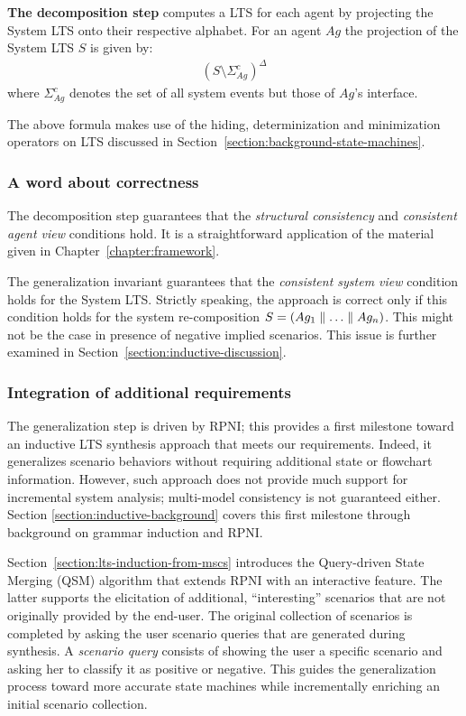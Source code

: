\noindent \textbf{The decomposition step} computes a LTS for each agent by projecting the System LTS onto their respective alphabet. For an agent $Ag$ the projection of the System LTS $S$ is given by:
\begin{align}
(S \setminus \Sigma_{Ag}^c)^\Delta
\end{align}
\noindent where $\Sigma_{Ag}^c$ denotes the set of all system events but those of $Ag$'s interface.

The above formula makes use of the hiding, determinization and minimization operators on LTS discussed in Section~\ref{section:background-state-machines}.

\subsubsection*{A word about correctness}

The decomposition step guarantees that the \emph{structural consistency} and \emph{consistent agent view} conditions hold. It is a straightforward application of the material given in Chapter~\ref{chapter:framework}. 

The generalization invariant guarantees that the \emph{consistent system view} condition holds for the System LTS. Strictly speaking, the approach is correct only if this condition holds for the system re-composition $S = (Ag_1 \parallel \ldots \parallel Ag_n)$. This might not be the case in presence of negative implied scenarios. This issue is further examined in Section~\ref{section:inductive-discussion}.

\subsubsection*{Integration of additional requirements}

The generalization step is driven by RPNI; this provides a first milestone toward an inductive LTS synthesis approach that meets our requirements. Indeed, it generalizes scenario behaviors without requiring additional state or flowchart information. However, such approach does not provide much support for incremental system analysis; multi-model consistency is not guaranteed either. Section \ref{section:inductive-background} covers this first milestone through background on grammar induction and RPNI.

Section~\ref{section:lts-induction-from-mscs} introduces the Query-driven State Merging (QSM) algorithm that extends RPNI with an interactive feature. The latter supports the elicitation of additional, ``interesting'' scenarios that are not originally provided by the end-user. The original collection of scenarios is completed by asking the user scenario queries that are generated during synthesis. A \emph{scenario query} consists of showing the user a specific scenario and asking her to classify it as positive or negative. This guides the generalization process toward more accurate state machines while incrementally enriching an initial scenario collection.

